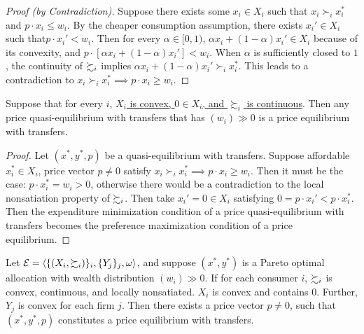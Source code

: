 \documentclass{report}
\begin{document}
		\begin{proof}[Proof (by Contradiction)]
			Suppose there exists some $x_i \in X_i$ such that $x_i \succ_i x_i^*$ and $p \cdot x_i \leq w_i$. By the cheaper consumption assumption, there exists $x_i' \in X_i$ such that$p \cdot x_i' < w_i$. Then for every $\alpha \in [0, 1)$, $\alpha x_i + (1 - \alpha) x_i' \in X_i$ because of its convexity, and $p \cdot [\alpha x_i + (1 - \alpha) x_i'] < w_i$. When $\alpha$ is sufficiently closed to $1$, the continuity of $\succsim_i$ implies $\alpha x_i + (1 - \alpha) x_i' \succ_i x_i^*$. This leads to a contradiction to $x_i \succ_i x_i^* \implies p \cdot x_i \geq w_i$.
		\end{proof}
		
		\begin{proposition}
			Suppose that for every $i$, \ul{$X_i$ is convex, $0 \in X_i$, and $\succsim_i$ is continuous}. Then any price quasi-equilibrium with transfers that has $(w_i) \gg 0$ is a price equilibrium with transfers.
		\end{proposition}
		
		\begin{proof}
			Let $(x^*, y^*, p)$ be a quasi-equilibrium with transfers. Suppose affordable $x_i^* \in X_i$, price vector $p \neq 0$ satisfy $x_i \succ_i x_i^* \implies p \cdot x_i \geq w_i$. Then it must be the case: $p \cdot x_i^* = w_i > 0$, otherwise there would be a contradiction to the local nonsatiation property of $\succsim_i$. Then take $x_i' = 0 \in X_i$ satisfying $0 = p \cdot x_i' < p \cdot x_i^*$. Then the expenditure minimization condition of a price quasi-equilibrium with transfers becomes the preference maximization condition of a price equilibrium.
		\end{proof}
		
		\begin{theorem}
			Let $\mathcal{{E}} = \langle \{(X_i, \succsim_i)\}_i, \{Y_j\}_j, \omega \rangle$, and suppose $(x^*, y^*)$ is a Pareto optimal allocation with wealth distribution $(w_i) \gg 0$. If for each consumer $i$, $\succsim_i$ is convex, continuous, and locally nonsatiated. $X_i$ is convex and contains $0$. Further, $Y_j$ is convex for each firm $j$. Then there exists a price vector $p \neq 0$, such that $(x^*, y^*, p)$ constitutes a price equilibrium with transfers.
		\end{theorem}
\end{document}
